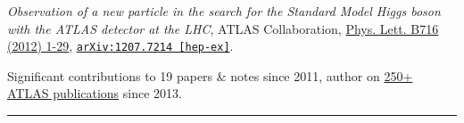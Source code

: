 \documentclass{letter}
\begin{document}
\textit{Observation of a new particle in the search for the Standard Model Higgs boson with the ATLAS detector at the LHC}, ATLAS Collaboration, \href{http://www.sciencedirect.com/science/article/pii/S037026931200857X}{Phys. Lett. B716 (2012) 1-29}, \href{https://arxiv.org/abs/1207.7214}{\texttt{arXiv:1207.7214 [hep-ex]}}.

\begin{flushright}
Significant contributions to 19 papers \& notes since 2011, author on \href{https://twiki.cern.ch/twiki/bin/view/AtlasPublic}{250+ ATLAS publications} since 2013.\\
\end{flushright}

\begin{flushleft}
\Large{\textsc{\textbf{\color{Maroon}{Conference Presentations}}}}
\hrule
\end{flushleft}
\end{document}
